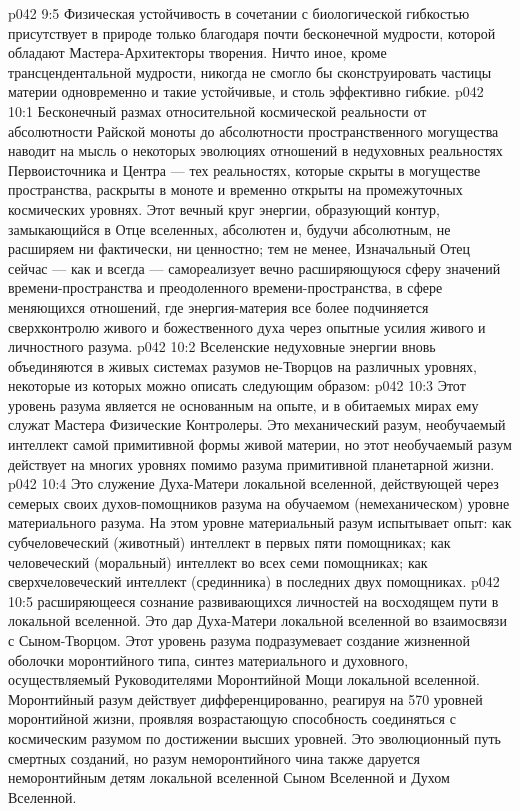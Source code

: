 \vs p042 9:5 Физическая устойчивость в сочетании с биологической гибкостью присутствует в природе только благодаря почти бесконечной мудрости, которой обладают Мастера\hyp{}Архитекторы творения. Ничто иное, кроме трансцендентальной мудрости, никогда не смогло бы сконструировать частицы материи одновременно и такие устойчивые, и столь эффективно гибкие.
\vs p042 10:1 Бесконечный размах относительной космической реальности от абсолютности Райской моноты до абсолютности пространственного могущества наводит на мысль о некоторых эволюциях отношений в недуховных реальностях Первоисточника и Центра --- тех реальностях, которые скрыты в могуществе пространства, раскрыты в моноте и временно открыты на промежуточных космических уровнях. Этот вечный круг энергии, образующий контур, замыкающийся в Отце вселенных, абсолютен и, будучи абсолютным, не расширяем ни фактически, ни ценностно; тем не менее, Изначальный Отец сейчас --- как и всегда --- самореализует вечно расширяющуюся сферу значений времени\hyp{}пространства и преодоленного времени\hyp{}пространства, в сфере меняющихся отношений, где энергия\hyp{}материя все более подчиняется сверхконтролю живого и божественного духа через опытные усилия живого и личностного разума.
\vs p042 10:2 Вселенские недуховные энергии вновь объединяются в живых системах разумов не\hyp{}Творцов на различных уровнях, некоторые из которых можно описать следующим образом:
\vs p042 10:3 \pc {}\bibnobreakspace {} Этот уровень разума является не основанным на опыте, и в обитаемых мирах ему служат Мастера Физические Контролеры. Это механический разум, необучаемый интеллект самой примитивной формы живой материи, но этот необучаемый разум действует на многих уровнях помимо разума примитивной планетарной жизни.
\vs p042 10:4 \pc {}\bibnobreakspace {} Это служение Духа\hyp{}Матери локальной вселенной, действующей через семерых своих духов\hyp{}помощников разума на обучаемом (немеханическом) уровне материального разума. На этом уровне материальный разум испытывает опыт: как субчеловеческий (животный) интеллект в первых пяти помощниках; как человеческий (моральный) интеллект во всех семи помощниках; как сверхчеловеческий интеллект (срединника) в последних двух помощниках.
\vs p042 10:5 \pc {}\bibnobreakspace {} расширяющееся сознание развивающихся личностей на восходящем пути в локальной вселенной. Это дар Духа\hyp{}Матери локальной вселенной во взаимосвязи с Сыном\hyp{}Творцом. Этот уровень разума подразумевает создание жизненной оболочки моронтийного типа, синтез материального и духовного, осуществляемый Руководителями Моронтийной Мощи локальной вселенной. Моронтийный разум действует дифференцированно, реагируя на 570 уровней моронтийной жизни, проявляя возрастающую способность соединяться с космическим разумом по достижении высших уровней. Это эволюционный путь смертных созданий, но разум неморонтийного чина также даруется неморонтийным детям локальной вселенной Сыном Вселенной и Духом Вселенной.
